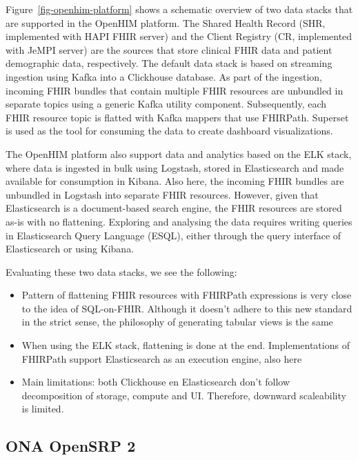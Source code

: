 \documentclass[
  authoryear]{elsarticle}
\providecommand{\tightlist}{%
  \setlength{\itemsep}{0pt}\setlength{\parskip}{0pt}}\usepackage{longtable,booktabs,array}
\begin{document}
Figure~\ref{fig-openhim-platform} shows a schematic overview of two data
stacks that are supported in the OpenHIM platform. The Shared Health
Record (SHR, implemented with HAPI FHIR server) and the Client Registry
(CR, implemented with JeMPI server) are the sources that store clinical
FHIR data and patient demographic data, respectively. The default data
stack is based on streaming ingestion using Kafka into a Clickhouse
database. As part of the ingestion, incoming FHIR bundles that contain
multiple FHIR resources are unbundled in separate topics using a generic
Kafka utility component. Subsequently, each FHIR resource topic is
flatted with Kafka mappers that use FHIRPath. Superset is used as the
tool for consuming the data to create dashboard visualizations.

The OpenHIM platform also support data and analytics based on the ELK
stack, where data is ingested in bulk using Logstash, stored in
Elasticsearch and made available for consumption in Kibana. Also here,
the incoming FHIR bundles are unbundled in Logstash into separate FHIR
resources. However, given that Elasticsearch is a document-based search
engine, the FHIR resources are stored as-is with no flattening.
Exploring and analysing the data requires writing queries in
Elasticsearch Query Language (ES\textbar QL), either through the query
interface of Elasticsearch or using Kibana.

Evaluating these two data stacks, we see the following:

\begin{itemize}
\tightlist
\item
  Pattern of flattening FHIR resources with FHIRPath expressions is very
  close to the idea of SQL-on-FHIR. Although it doesn't adhere to this
  new standard in the strict sense, the philosophy of generating tabular
  views is the same
\item
  When using the ELK stack, flattening is done at the end.
  Implementations of FHIRPath support Elasticsearch as an execution
  engine, also here
\item
  Main limitations: both Clickhouse en Elasticsearch don't follow
  decomposition of storage, compute and UI. Therefore, downward
  scaleability is limited.
\end{itemize}

\subsection{ONA OpenSRP 2}\label{ona-opensrp-2}
\end{document}
